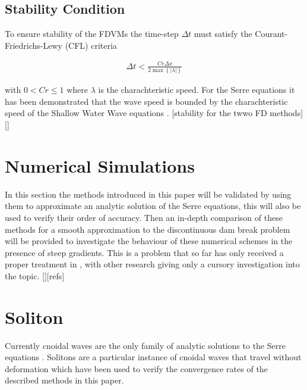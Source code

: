 \documentclass[SingleSpace,12pt,Proceedings]{Serre_ASCE}
\begin{document}
\subsection{Stability Condition} 
To ensure stability of the FDVMs the time-step $\Delta t$ must satisfy the Courant-Friedrichs-Lewy (CFL) criteria \cite{Harten-etal-1983-357}

\begin{gather}
\label{eq:CFL}
\Delta t < \frac{Cr \Delta x}{2\max \left\lbrace |\lambda| \right\rbrace}
\end{gather}

 with $0<Cr\le 1$ where $\lambda$ is the charachteristic speed. For the Serre equations it has been demonstrated that the wave speed is bounded by the charachteristic speed of the Shallow Water Wave equations \cite{Hank-etal-2010-2034}.
 [stability for the twwo FD methods][]

\section{Numerical Simulations}
\label{section:Numerical Simulations}
In this section the methods introduced in this paper will be validated by using them to approximate an analytic solution of the Serre equations, this will also be used to verify their order of accuracy. Then an in-depth comparison of these methods for a smooth approximation to the discontinuous dam break problem will be provided to investigate the behaviour of these numerical schemes in the presence of steep gradients. This is a problem that so far has only received a proper treatment in \cite{El-etal-2006}, with other research giving only a cursory investigation into the topic. [][refs]

\section{Soliton}
\label{section:Convergence Rate}
Currently cnoidal waves are the only family of analytic solutions to the Serre equations \cite{Carter-Cienfuegos-2010-259}. Solitons are a particular instance of cnoidal waves that travel without deformation which have been used to verify the convergence rates of the described methods in this paper. 
\end{document}
